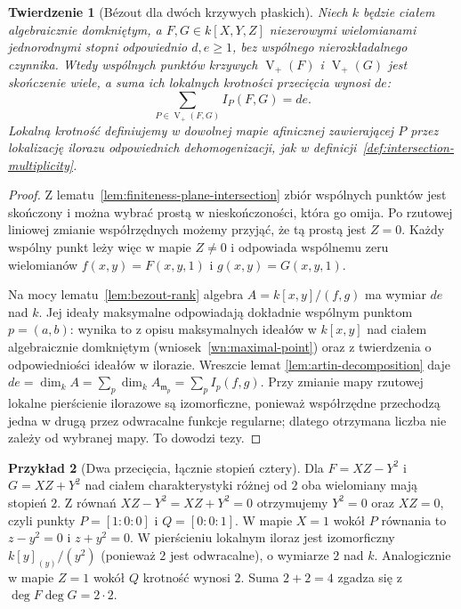 \documentclass[11pt,a4paper,openany]{report}
\numberwithin{equation}{section}
\theoremstyle{plain}
\newtheorem{twierdzenie}{Twierdzenie}[section]
\theoremstyle{definition}
\newtheorem{przyklad}[twierdzenie]{Przykład}
\theoremstyle{remark}
\newcommand{\V}{\operatorname V}
\begin{document}
\begin{twierdzenie}[Bézout dla dwóch krzywych płaskich]
\label{tw:bezout-general}
Niech $k$ będzie ciałem algebraicznie domkniętym,
a $F,G\in k[X,Y,Z]$ niezerowymi wielomianami jednorodnymi
stopni odpowiednio $d,e\ge1$, bez wspólnego
nierozkładalnego czynnika. Wtedy wspólnych punktów
krzywych $\V_+(F)$ i $\V_+(G)$ jest skończenie wiele,
a suma ich lokalnych krotności przecięcia wynosi $de$:
\[
 \sum_{P\in\V_+(F,G)} I_P(F,G)=de.
\]
Lokalną krotność definiujemy w dowolnej mapie afinicznej
zawierającej $P$ przez lokalizację ilorazu odpowiednich
dehomogenizacji, jak w definicji~\ref{def:intersection-multiplicity}.
\end{twierdzenie}
\begin{proof}
Z lematu~\ref{lem:finiteness-plane-intersection} zbiór
wspólnych punktów jest skończony i można wybrać prostą
w nieskończoności, która go omija. Po rzutowej liniowej
zmianie współrzędnych możemy przyjąć, że tą prostą
jest $Z=0$. Każdy wspólny punkt leży więc w mapie
$Z\ne0$ i odpowiada wspólnemu zeru wielomianów
$f(x,y)=F(x,y,1)$ i $g(x,y)=G(x,y,1)$.

Na mocy lematu~\ref{lem:bezout-rank} algebra
$A=k[x,y]/(f,g)$ ma wymiar $de$ nad $k$.
Jej ideały maksymalne odpowiadają dokładnie wspólnym
punktom $p=(a,b)$: wynika to z opisu maksymalnych ideałów
w $k[x,y]$ nad ciałem algebraicznie domkniętym
(wniosek~\ref{wn:maximal-point}) oraz z twierdzenia
o odpowiedniości ideałów w ilorazie. Wreszcie lemat
\ref{lem:artin-decomposition} daje
$de=\dim_k A=\sum_{p}\dim_k A_{\mathfrak m_p}
=\sum_p I_p(f,g)$. Przy zmianie mapy rzutowej
lokalne pierścienie ilorazowe są izomorficzne, ponieważ
współrzędne przechodzą jedna w drugą przez odwracalne
funkcje regularne; dlatego otrzymana liczba nie zależy
od wybranej mapy. To dowodzi tezy.
\end{proof}

\begin{przyklad}[Dwa przecięcia, łącznie stopień cztery]
Dla $F=XZ-Y^2$ i $G=XZ+Y^2$ nad ciałem
charakterystyki różnej od $2$ oba wielomiany mają
stopień $2$. Z równań $XZ-Y^2=XZ+Y^2=0$
otrzymujemy $Y^2=0$ oraz $XZ=0$, czyli punkty
$P=[1:0:0]$ i $Q=[0:0:1]$. W mapie $X=1$ wokół $P$
równania to $z-y^2=0$ i $z+y^2=0$.
W pierścieniu lokalnym iloraz jest izomorficzny
$k[y]_{(y)}/(y^2)$ (ponieważ $2$ jest odwracalne),
o wymiarze $2$ nad $k$. Analogicznie w mapie $Z=1$
wokół $Q$ krotność wynosi $2$. Suma $2+2=4$ zgadza się
z $\deg F\deg G=2\cdot2$.
\end{przyklad}
\end{document}
